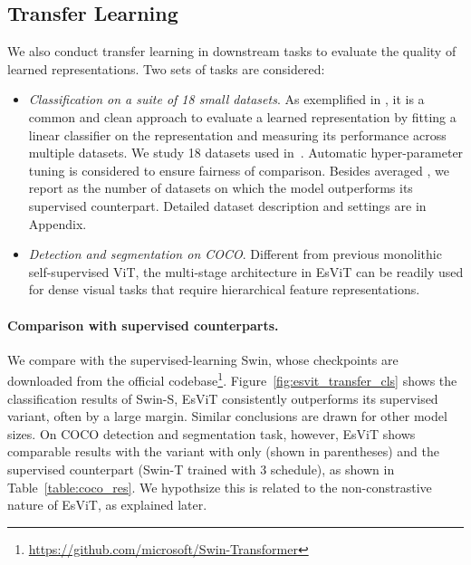 \documentclass{article} \usepackage{iclr2022_conference,times}
\newcommand{\shortname}{EsViT}
\begin{document}
\vspace{-2mm}
\subsection{Transfer Learning}
\vspace{-2mm}
We also conduct transfer learning in downstream tasks to evaluate the quality of learned representations. Two sets of tasks are considered:


\begin{minipage}{0.99\textwidth}
\centering

\begin{itemize}[leftmargin=5.5mm]
\item {\em Classification on a suite of 18 small datasets}. As exemplified in \citep{radford2021learning}, it is a common and clean approach to evaluate a learned representation by fitting a linear classifier on
the representation and measuring its performance across multiple datasets.  We study 18 datasets used in~\citep{radford2021learning}. Automatic hyper-parameter tuning is considered to ensure fairness of comparison. Besides averaged , we report  as the number of datasets on which the model outperforms its supervised counterpart. Detailed dataset description and settings are in Appendix.
\end{itemize}

\end{minipage}

\begin{minipage}{0.99\textwidth}
\centering

\begin{itemize}[leftmargin=5.5mm]
\item {\em Detection and segmentation on COCO}. Different from previous monolithic self-supervised ViT, the multi-stage architecture in \shortname{} can be readily used for dense visual tasks that require hierarchical feature representations.
\end{itemize}
\vspace{-2mm}
\end{minipage}


\paragraph{Comparison with supervised counterparts.} We compare with the supervised-learning Swin, whose checkpoints are downloaded from the official codebase\footnote{\url{https://github.com/microsoft/Swin-Transformer}}. 
Figure~\ref{fig:esvit_transfer_cls} shows the classification results of Swin-S, \shortname{} consistently outperforms its supervised variant, often by a large margin. Similar conclusions are drawn for other model sizes. On COCO detection and segmentation task, however, \shortname{} shows comparable results with the variant with  only (shown in parentheses) and the supervised counterpart (Swin-T trained with 3 schedule), as shown in Table~\ref{table:coco_res}. We hypothsize this is related to the non-constrastive nature of \shortname{}, as explained later.
\end{document}
